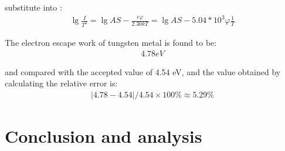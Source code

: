 \documentclass[UTF8]{article}
\begin{document}
substitute into :
\begin{eqnarray}
\lg \frac{I}{T^{2}}=\lg A S-\frac{e \varphi}{2.30 k T}=\lg A S-5.04 * 10^{3} \varphi \frac{1}{T}
\end{eqnarray}

The electron escape work of tungsten metal is found to be:
\begin{eqnarray}
4.78eV
\end{eqnarray}

and compared with the accepted value of 4.54 eV, and the value obtained by calculating the relative error is:
\begin{eqnarray}
|4.78-4.54| / 4.54 \times 100 \% \approx 5.29 \%
\end{eqnarray}


\section{Conclusion and analysis}
\end{document}
